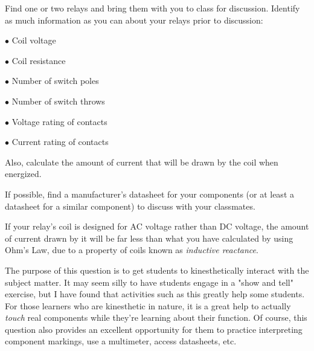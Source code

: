 

Find one or two relays and bring them with you to class for discussion.  Identify as much information as you can about your relays prior to discussion:

\medskip
\item{$\bullet$} Coil voltage
\item{$\bullet$} Coil resistance
\item{$\bullet$} Number of switch poles
\item{$\bullet$} Number of switch throws
\item{$\bullet$} Voltage rating of contacts
\item{$\bullet$} Current rating of contacts
\medskip

Also, calculate the amount of current that will be drawn by the coil when energized.







If possible, find a manufacturer's datasheet for your components (or at least a datasheet for a similar component) to discuss with your classmates.

If your relay's coil is designed for AC voltage rather than DC voltage, the amount of current drawn by it will be far less than what you have calculated by using Ohm's Law, due to a property of coils known as {\it inductive reactance}.







The purpose of this question is to get students to kinesthetically interact with the subject matter.  It may seem silly to have students engage in a "show and tell" exercise, but I have found that activities such as this greatly help some students.  For those learners who are kinesthetic in nature, it is a great help to actually {\it touch} real components while they're learning about their function.  Of course, this question also provides an excellent opportunity for them to practice interpreting component markings, use a multimeter, access datasheets, etc.




